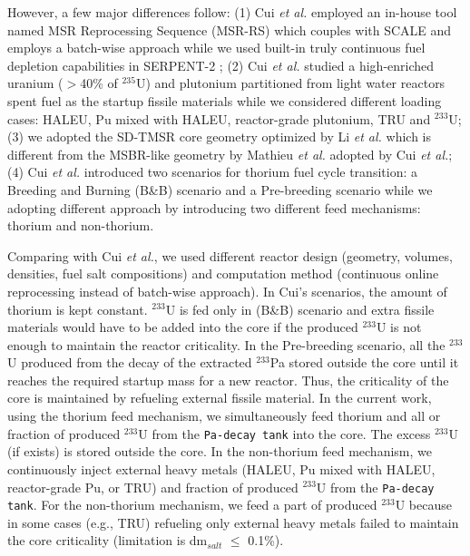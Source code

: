 However, a few major differences follow: 
(1) Cui \emph{et al.} employed an in-house tool named MSR Reprocessing 
Sequence (MSR-RS) \cite{ZOU2015114} which couples with SCALE and employs a 
batch-wise approach while we used built-in truly continuous fuel depletion 
capabilities in SERPENT-2 \cite{aufiero2013extended}; 
(2) Cui \emph{et al.} studied a high-enriched uranium ($>$40\% of $^{235}$U) 
and plutonium partitioned from light water reactors spent fuel as the startup 
fissile materials while we considered different loading cases: HALEU, Pu 
mixed with HALEU, reactor-grade plutonium, TRU and $^{233}$U;
(3) we adopted the SD-TMSR core geometry optimized by Li \emph{et al.} 
\cite{li_optimization_2018} which is different from the MSBR-like geometry by 
Mathieu \emph{et al.} \cite{mathieu_possible_2009} adopted by Cui \emph{et 
al.}; 
(4) Cui \emph{et al.} introduced two scenarios for thorium fuel cycle 
transition: a Breeding and Burning (B\&B) scenario and a Pre-breeding scenario 
while we adopting different approach by introducing two different feed 
mechanisms: thorium and non-thorium.

Comparing with Cui \emph{et al.}, we used different reactor design (geometry, 
volumes, densities, fuel salt compositions) and computation method (continuous 
online reprocessing instead of batch-wise approach). In Cui's scenarios, the 
amount of thorium is kept constant. $^{233}$U is fed only in (B\&B) scenario 
and extra fissile materials would have to be added into the core if the 
produced $^{233}$U is not enough to maintain the reactor criticality. In the 
Pre-breeding scenario, all the $^{233}$U produced from the decay of the 
extracted $^{233}$Pa stored outside the core until it reaches the required 
startup mass for a new reactor. Thus, the criticality of the core is 
maintained by refueling external fissile material. In the current work, using 
the thorium feed mechanism, we simultaneously feed thorium and all or fraction 
of produced $^{233}$U from the \texttt{Pa-decay tank} into the core. The 
excess $^{233}$U (if exists) is stored outside the core. In the non-thorium 
feed mechanism, we continuously inject external heavy metals (HALEU, Pu mixed 
with HALEU, reactor-grade Pu, or TRU) and fraction of produced $^{233}$U from 
the \texttt{Pa-decay tank}. For the non-thorium mechanism, we feed a part of 
produced $^{233}$U because in some cases (e.g., TRU) refueling only external 
heavy metals failed to maintain the core criticality (limitation is 
dm$_{salt}$ $\leq$ 0.1\%). 

